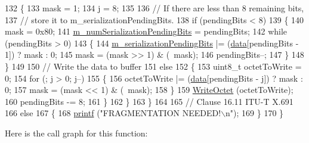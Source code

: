 \begin{DoxyCode}
132         \{
133           mask = 1;
134           j = 8;
135 
136           \textcolor{comment}{// If there are less than 8 remaining bits,}
137           \textcolor{comment}{// store it to m\_serializationPendingBits.}
138           \textcolor{keywordflow}{if} (pendingBits < 8)
139             \{
140               mask = 0x80;
141               \hyperlink{classns3_1_1Asn1Header_a663fc3287a1e7e4c383575e432480e6c}{m\_numSerializationPendingBits} = pendingBits;
142               \textcolor{keywordflow}{while} (pendingBits > 0)
143                 \{
144                   \hyperlink{classns3_1_1Asn1Header_ad48f6854caeba65c2631675cf416a2c9}{m\_serializationPendingBits} |= (\hyperlink{topology-example-sim_8cc_a26c65296e316af77b787dc77469bb2a4}{data}[pendingBits - 1]) ? 
      mask : 0;
145                   mask = (mask >> 1) & (~mask);
146                   pendingBits--;
147                 \}
148             \}
149 
150           \textcolor{comment}{// Write the data to buffer}
151           \textcolor{keywordflow}{else}
152             \{
153               uint8\_t octetToWrite = 0;
154               \textcolor{keywordflow}{for} (; j > 0; j--)
155                 \{
156                   octetToWrite |= (\hyperlink{topology-example-sim_8cc_a26c65296e316af77b787dc77469bb2a4}{data}[pendingBits - j]) ? mask : 0;
157                   mask = (mask << 1) & (~mask);
158                 \}
159               \hyperlink{classns3_1_1Asn1Header_ae4514f79e0370ceb678de99b4a6a59f0}{WriteOctet} (octetToWrite);
160               pendingBits -= 8;
161             \}
162         \}
163     \}
164 
165   \textcolor{comment}{// Clause 16.11 ITU-T X.691}
166   \textcolor{keywordflow}{else}
167     \{
168       \hyperlink{generate__test__data__lte__sinr_8m_a285ffaf9b73177f0539bab78b6d56a23}{printf} (\textcolor{stringliteral}{"FRAGMENTATION NEEDED!\(\backslash\)n"});
169     \}
170 \}
\end{DoxyCode}


Here is the call graph for this function\+:


